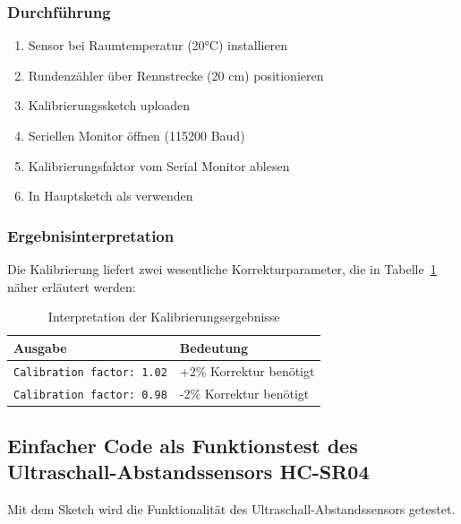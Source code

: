 \subsubsection{Durchführung}
\begin{enumerate}
	\item Sensor bei Raumtemperatur (20°C) installieren
	\item Rundenzähler über Rennstrecke (20 cm) positionieren
	\item Kalibrierungssketch uploaden
	\item Seriellen Monitor öffnen (115200 Baud)
	\item Kalibrierungsfaktor vom Serial Monitor ablesen
	\item In Hauptsketch als  verwenden
\end{enumerate}

\subsubsection{Ergebnisinterpretation}
Die Kalibrierung liefert zwei wesentliche Korrekturparameter, die in Tabelle~\ref{Kalibrierung} näher erläutert werden:
\begin{table}[h]
	\centering
	\begin{tabular}{|l|l|}
		\hline
		\rowcolor{gray!20}\textbf{Ausgabe} & \textbf{Bedeutung} \\ \hline
		\texttt{Calibration factor: 1.02} & +2\% Korrektur benötigt \\ \hline
		\texttt{Calibration factor: 0.98} & -2\% Korrektur benötigt \\ \hline
	\end{tabular}
	\caption{Interpretation der Kalibrierungsergebnisse}
	\label{Kalibrierung}
\end{table}

\subsection{Einfacher Code als Funktionstest des Ultraschall-Abstandssensors HC-SR04}
\label{SimpleCode}
Mit dem Sketch  wird die Funktionalität des Ultraschall-Abstandssensors getestet.

\begin{code}
\end{code}

